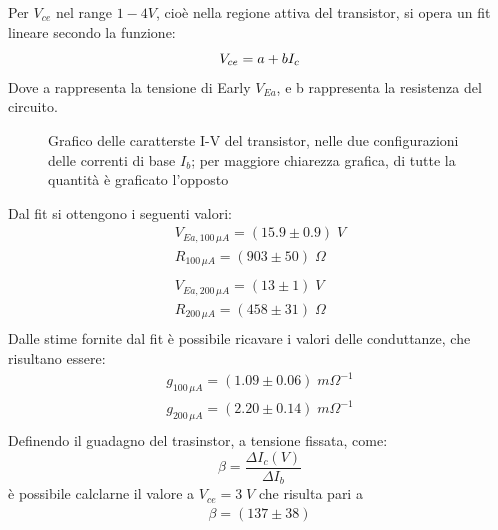 \documentclass{article}
\begin{document}
Per $V_{ce}$ nel range $1-4 V$, cioè nella regione attiva del transistor, si opera un fit lineare secondo la funzione:
\begin{equation}
    V_{ce} = a + b I_c\\
\end{equation}
Dove a rappresenta la tensione di Early $V_{Ea}$, e b rappresenta la resistenza del circuito.\\
\begin{figure}[H]
    \begin{center}
        \scalebox{0.7}{}
        \caption{\centering\label{fig:multigraph}Grafico delle caratterste I-V del transistor, nelle due configurazioni delle correnti di base $I_b$; per maggiore chiarezza grafica, di tutte la quantità è graficato l'opposto}
    \end{center}
\end{figure}
Dal fit si ottengono i seguenti valori:
\begin{equation}
    \begin{aligned}
        V_{Ea,100\,\mu A}=(15.9\pm 0.9) \;V  \\
        R_{100\,\mu A}=(903 \pm 50) \;\Omega \\
        \\
        V_{Ea,200\,\mu A}=(13\pm 1) \;V      \\
        R_{200\,\mu A}=(458 \pm 31) \;\Omega \\
    \end{aligned}
\end{equation}
Dalle stime fornite dal fit è possibile ricavare i valori delle conduttanze, che risultano essere:
\begin{equation}
    \begin{aligned}
        g_{100 \,\mu A}=(1.09 \pm 0.06) \;m\Omega^{-1} \\
        g_{200 \,\mu A}=(2.20 \pm 0.14) \;m\Omega^{-1} \\
    \end{aligned}
\end{equation}
Definendo il guadagno del trasinstor, a tensione fissata, come:
\begin{equation}
    \beta= \frac{\Delta I_c(V)}{\Delta I_b}
\end{equation}
è possibile calclarne il valore a $V_{ce}=3 \;V$ che risulta pari a
\begin{equation}
    \begin{aligned}
        \beta=(137\pm38)
    \end{aligned}
\end{equation}
\end{document}
